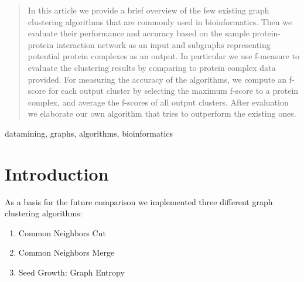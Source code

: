 \documentclass[journal]{IEEEtran}
\begin{document}




\maketitle


\begin{abstract}
In this article we provide a brief overview of the few existing graph clustering algorithms that are commonly used in bioinformatics. Then we evaluate their performance and accuracy based on the sample protein-protein interaction network as an input and subgraphs representing potential protein complexes as an output. In particular we use  f-measure to evaluate the clustering results by comparing to protein complex data provided. For measuring the accuracy of the algorithms, we compute an f-score for each output cluster by selecting the maximum f-score to a protein complex, and average the f-scores of all output clusters. After evaluation we elaborate our own algorithm that tries to outperform the existing ones. 
\end{abstract}

\begin{IEEEkeywords}
datamining, graphs, algorithms, bioinformatics
\end{IEEEkeywords}






%
\IEEEpeerreviewmaketitle



\section{Introduction}
As a basis for the future comparison we implemented three different graph clustering algorithms:
\begin{enumerate}
	\item Common Neighbors Cut
	\item Common Neighbors Merge
	\item Seed Growth: Graph Entropy
\end{enumerate}
\end{document}
